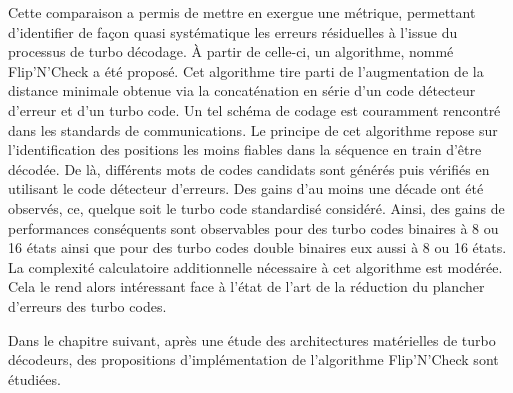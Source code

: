Cette comparaison a permis de mettre en exergue une métrique, permettant d'identifier de façon quasi systématique
les erreurs résiduelles à l'issue du processus de turbo décodage. À partir de celle-ci, un algorithme, nommé Flip'N'Check
a été proposé. Cet algorithme tire parti de l'augmentation de la distance minimale obtenue via la concaténation en série 
d'un code détecteur d'erreur et d'un turbo code. Un tel schéma de codage est couramment rencontré dans les standards de 
communications. Le principe de cet algorithme repose sur l'identification des positions les moins fiables dans la séquence en train 
d'être décodée. De là, différents mots de codes candidats sont générés puis vérifiés en utilisant le code détecteur d'erreurs.
Des gains d'au moins une décade ont été observés, ce, quelque soit le turbo code standardisé considéré. Ainsi, des gains
de performances conséquents sont observables pour des turbo codes binaires à 8 ou 16 états ainsi que pour des turbo codes 
double binaires eux aussi à 8 ou 16 états. La complexité calculatoire additionnelle nécessaire à cet algorithme est modérée.
Cela le rend alors intéressant face à l’état de l'art de la réduction du plancher d'erreurs des turbo codes.

Dans le chapitre suivant, après une étude des architectures matérielles de turbo décodeurs, des propositions d'implémentation 
de l'algorithme Flip'N'Check sont étudiées.



